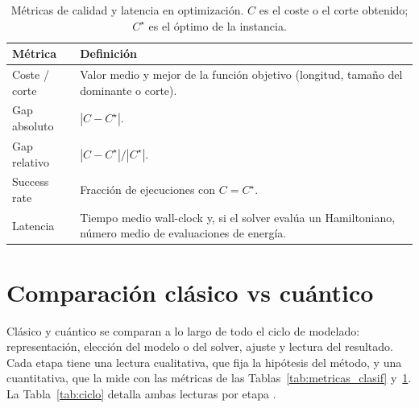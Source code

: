 \begin{table}[!htbp]
\centering
\small
\begin{tabularx}{\linewidth}{@{}>{\raggedright\arraybackslash}p{3.15cm} >{\raggedright\arraybackslash}X@{}}
\toprule
\textbf{Métrica} & \textbf{Definición} \\
\midrule
Coste / corte & Valor medio y mejor de la función objetivo (longitud, tamaño del dominante o corte). \\
Gap absoluto & $|C-C^\star|$. \\
Gap relativo & $|C-C^\star|/|C^\star|$. \\
Success rate & Fracción de ejecuciones con $C=C^\star$. \\
Latencia & Tiempo medio wall-clock y, si el solver evalúa un Hamiltoniano, número medio de evaluaciones de energía. \\
\bottomrule
\end{tabularx}
\caption{Métricas de calidad y latencia en optimización. $C$ es el coste o el corte obtenido; $C^\star$ es el óptimo de la instancia.}
\label{tab:metricas_opt}
\end{table}

\section{Comparación clásico vs cuántico}

Clásico y cuántico se comparan a lo largo de todo el ciclo de modelado: representación, elección del modelo o del solver, ajuste y lectura del resultado. Cada etapa tiene una lectura cualitativa, que fija la hipótesis del método, y una cuantitativa, que la mide con las métricas de las Tablas~\ref{tab:metricas_clasif} y~\ref{tab:metricas_opt}. La Tabla~\ref{tab:ciclo} detalla ambas lecturas por etapa \citep{bowles2024, lubinski2024, yu2026}.

